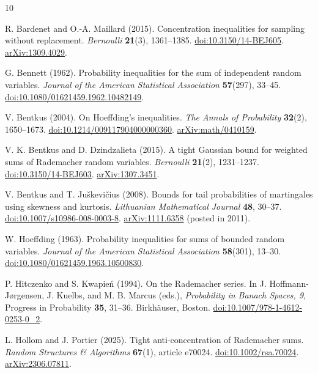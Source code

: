 \documentclass[11pt,letterpaper]{article}
\numberwithin{equation}{section}
\theoremstyle{definition}
\theoremstyle{remark}
\begin{document}
\FloatBarrier
\begin{thebibliography}{10}
\small

R. Bardenet and O.-A. Maillard (2015).
Concentration inequalities for sampling without replacement.
\emph{Bernoulli} \textbf{21}(3), 1361--1385.
\href{https://doi.org/10.3150/14-BEJ605}{doi:10.3150/14-BEJ605}.
\href{https://arxiv.org/abs/1309.4029}{arXiv:1309.4029}.

G. Bennett (1962).
Probability inequalities for the sum of independent random variables.
\emph{Journal of the American Statistical Association} \textbf{57}(297),
33--45.
\href{https://doi.org/10.1080/01621459.1962.10482149}
{doi:10.1080/01621459.1962.10482149}.

V. Bentkus (2004).
On Hoeffding's inequalities.
\emph{The Annals of Probability} \textbf{32}(2), 1650--1673.
\href{https://doi.org/10.1214/009117904000000360}
{doi:10.1214/009117904000000360}.
\href{https://arxiv.org/abs/math/0410159}{arXiv:math/0410159}.

V. K. Bentkus and D. Dzindzalieta (2015).
A tight Gaussian bound for weighted sums of Rademacher random variables.
\emph{Bernoulli} \textbf{21}(2), 1231--1237.
\href{https://doi.org/10.3150/14-BEJ603}{doi:10.3150/14-BEJ603}.
\href{https://arxiv.org/abs/1307.3451}{arXiv:1307.3451}.

V. Bentkus and T. Ju\v skevi\v cius (2008).
Bounds for tail probabilities of martingales using skewness and kurtosis.
\emph{Lithuanian Mathematical Journal} \textbf{48}, 30--37.
\href{https://doi.org/10.1007/s10986-008-0003-8}
{doi:10.1007/s10986-008-0003-8}.
\href{https://arxiv.org/abs/1111.6358}{arXiv:1111.6358}
(posted in 2011).

W. Hoeffding (1963).
Probability inequalities for sums of bounded random variables.
\emph{Journal of the American Statistical Association} \textbf{58}(301),
13--30.
\href{https://doi.org/10.1080/01621459.1963.10500830}
{doi:10.1080/01621459.1963.10500830}.

P. Hitczenko and S. Kwapie\'n (1994).
On the Rademacher series.
In J. Hoffmann-J\o rgensen, J. Kuelbs, and M. B. Marcus (eds.),
\emph{Probability in Banach Spaces, 9}, Progress in Probability
\textbf{35}, 31--36. Birkh\"auser, Boston.
\href{https://doi.org/10.1007/978-1-4612-0253-0_2}
{doi:10.1007/978-1-4612-0253-0\_2}.

L. Hollom and J. Portier (2025).
Tight anti-concentration of Rademacher sums.
\emph{Random Structures \& Algorithms} \textbf{67}(1), article e70024.
\href{https://doi.org/10.1002/rsa.70024}{doi:10.1002/rsa.70024}.
\href{https://arxiv.org/abs/2306.07811}{arXiv:2306.07811}.


\end{thebibliography}
\end{document}

